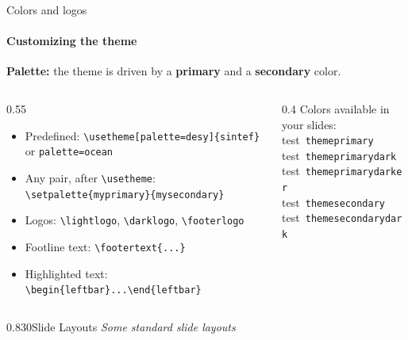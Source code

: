 \documentclass{beamer}
\newcommand{\testcolor}[1]{\colorbox{#1}{\textcolor{#1}{test}}~\texttt{#1}}
\begin{document}
\begin{frame}[fragile]{Colors and logos}
	\framesubtitle{Customizing the theme}
	\begin{leftbar}
		\textbf{Palette:} the theme is driven by a \textbf{primary} and a \textbf{secondary} color.
	\end{leftbar}
	\begin{columns}[t]
		\begin{column}{0.55\textwidth}
			\small
			\begin{itemize}
				\item Predefined: \verb|\usetheme[palette=desy]{sintef}| or \verb|palette=ocean|
				\item Any pair, after \verb|\usetheme|:\\
				      \verb|\setpalette{myprimary}{mysecondary}|
				\item Logos: \verb|\lightlogo|, \verb|\darklogo|, \verb|\footerlogo|
				\item Footline text: \verb|\footertext{...}|
				\item Highlighted text: \verb|\begin{leftbar}...\end{leftbar}|
			\end{itemize}
		\end{column}
		\begin{column}{0.4\textwidth}
			\small
			Colors available in your slides:\\[.2cm]
			\testcolor{themeprimary}\\
			\testcolor{themeprimarydark}\\
			\testcolor{themeprimarydarker}\\
			\testcolor{themesecondary}\\
			\testcolor{themesecondarydark}
		\end{column}
	\end{columns}
\end{frame}

\begin{chapter}{0.8}{3}{0}{Slide Layouts}
 \textit{Some standard slide layouts}
\end{chapter}
\end{document}
